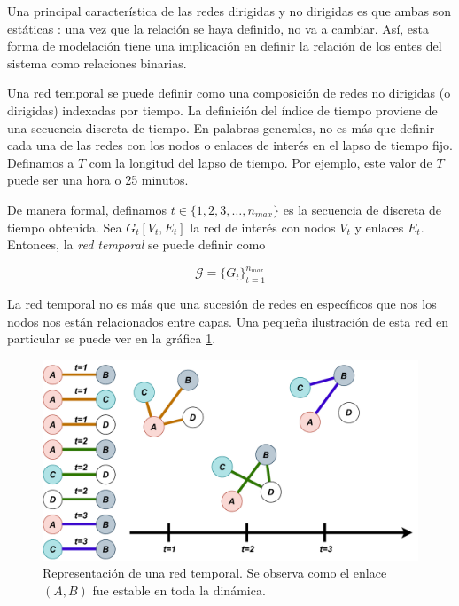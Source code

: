 \documentclass[../main.tex]{subfiles}
\begin{document}
Una principal característica de las redes dirigidas y no dirigidas es que ambas son estáticas : una vez que la relación se haya definido, no va a cambiar. Así, esta forma de modelación tiene una implicación en definir la relación de los entes del sistema como relaciones binarias.

Una red temporal se puede definir como una composición de redes no dirigidas (o dirigidas) indexadas por tiempo. La definición del índice de tiempo proviene de una secuencia discreta de tiempo.  En palabras generales, no es más que definir cada una de las redes con los nodos o enlaces de interés en el lapso de tiempo fijo. Definamos a $T$ com la longitud del lapso de tiempo. Por ejemplo, este valor de $T$ puede ser una hora o 25 minutos.

De manera formal, definamos $t \in \{ 1, 2, 3, \dots , n_{max} \}$ es la secuencia de discreta de tiempo obtenida. Sea $G_{t} [ V_{t} , E_{t}] $ la red de interés con nodos $V_{t}$ y enlaces $E_{t}$. Entonces, la \textit{red temporal} se puede definir como

\begin{equation*}
    \mathcal{G} = \{ G_{t} \}_{t = 1 }^{n_{max} }
\end{equation*}

La red temporal no es más que una sucesión de redes en específicos que nos los nodos nos están relacionados entre capas.  Una pequeña ilustración de esta red en particular se puede ver en la gráfica \ref{fig:marcoteorico_redtemporal}.

\begin{figure}[h!]
    \centering
    \includegraphics[scale = 0.6]{images/marcoteorico_redtemporal.drawio.pdf}
    \caption{Representación de una red temporal. Se observa como el enlace $(A,B)$ fue estable en toda la dinámica. }
    \label{fig:marcoteorico_redtemporal}
\end{figure}
\end{document}
